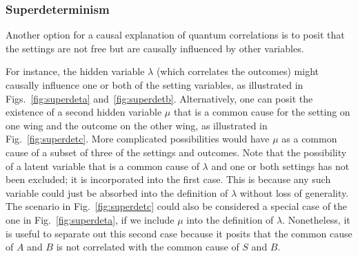 \documentclass[letterpaper,onecolumn,nofootinbib]{revtex4}
\begin{document}
\subsubsection{Superdeterminism}

Another option for a causal explanation of quantum correlations is to posit that the settings are not free but are causally influenced by other variables.

For instance, the hidden variable $\lambda$ (which correlates the outcomes) might causally influence one or both of the setting variables, as illustrated in Figs.~\ref{fig:superdeta} and~\ref{fig:superdetb}. Alternatively, one can posit the existence of a second hidden variable $\mu$ that is a common cause for the setting on one wing and the outcome on the other wing, as illustrated in Fig.~\ref{fig:superdetc}.  More complicated possibilities would have $\mu$ as a common cause of a subset of three of the settings and outcomes.
Note that the possibility of a latent variable that is a common cause of $\lambda$ and one or both settings has not been excluded; it is incorporated into the first case.  This is because any such variable could just be absorbed into the definition of $\lambda$ without loss of generality.
The scenario in Fig.~\ref{fig:superdetc} could also be considered a special case of the one in Fig.~\ref{fig:superdeta}, if we include $\mu$ into the definition of $\lambda$.  Nonetheless, it is useful to separate out this second case because it posits that the common cause of $A$ and $B$ is not correlated with the common cause of $S$ and $B$.
\end{document}
